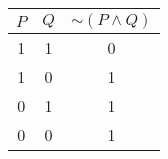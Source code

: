\begin{tabular}{|c|c||c|}
\hline
$ P $ & $ Q $ & $  \sim (P \wedge Q) $ \\
\hline
1 & 1 & 0 \\
1 & 0 & 1 \\
0 & 1 & 1 \\
0 & 0 & 1 \\
\hline
\end{tabular}
